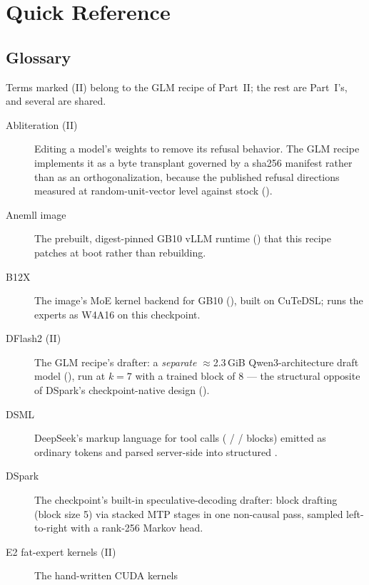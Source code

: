 \chapter{Quick Reference}
\label{ch:appendix}
\renewcommand{\thetable}{A.\arabic{table}}
\setcounter{table}{0}

\section*{Glossary}

Terms marked (II) belong to the GLM recipe of Part~II; the rest are
Part~I's, and several are shared.

\begin{description}
  \item[Abliteration (II)] Editing a model's weights to remove its
    refusal behavior. The GLM recipe implements it as a byte transplant
    governed by a sha256 manifest rather than as an orthogonalization,
    because the published refusal directions measured at random-unit-vector
    level against stock  ().
  \item[Anemll image] The prebuilt, digest-pinned GB10 vLLM runtime
    () that this recipe
    patches at boot rather than rebuilding.
  \item[B12X] The image's MoE kernel backend for GB10
    (), built on CuTeDSL; runs the
    experts as W4A16 on this checkpoint.
  \item[DFlash2 (II)] The GLM recipe's drafter: a \emph{separate}
    $\approx$2.3\,GiB Qwen3-architecture draft model
    (), run at $k{=}7$ with a trained
    block of 8 --- the structural opposite of DSpark's checkpoint-native
    design ().
  \item[DSML] DeepSeek's markup language for tool calls
    ( /  /  blocks)
    emitted as ordinary tokens and parsed server-side into structured
    .
  \item[DSpark] The checkpoint's built-in speculative-decoding drafter:
    block drafting (block size 5) via stacked MTP stages in one non-causal
    pass, sampled left-to-right with a rank-256 Markov head.
  \item[E2 fat-expert kernels (II)] The hand-written CUDA kernels

\end{description}
